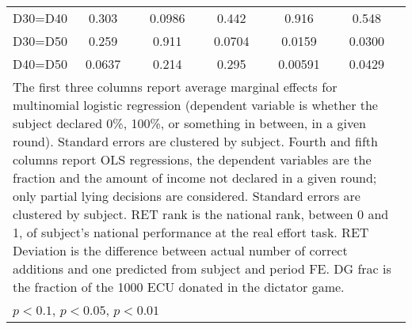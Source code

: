 \begin{tabular}{l|cccccc|cc|cc}
D30=D40         &    0.303         &         &   0.0986         &         &    0.442         &         &    0.916         &         &    0.548         &         \\
D30=D50         &    0.259         &         &    0.911         &         &   0.0704         &         &   0.0159         &         &   0.0300         &         \\
D40=D50         &   0.0637         &         &    0.214         &         &    0.295         &         &  0.00591         &         &   0.0429         &         \\
\hline\hline
\multicolumn{11}{p{18cm}}{\tiny The first three columns report average marginal effects for multinomial logistic regression (dependent variable is whether the subject declared 0\%, 100\%, or something in between, in a given round). Standard errors are clustered by subject. Fourth and fifth columns report OLS regressions, the dependent variables are the fraction and the amount of income not declared in a given round; only partial lying decisions are considered. Standard errors are clustered by subject. RET rank is the national rank, between 0 and 1, of subject's national performance at the real effort task. RET Deviation is the difference between actual number of correct additions and one predicted from subject and period FE. DG frac is the fraction of the 1000 ECU donated in the dictator game.}\\
\multicolumn{11}{l}{\tiny \sym{*} \(p<0.1\), \sym{**} \(p<0.05\), \sym{***} \(p<0.01\)}\\
\end{tabular}